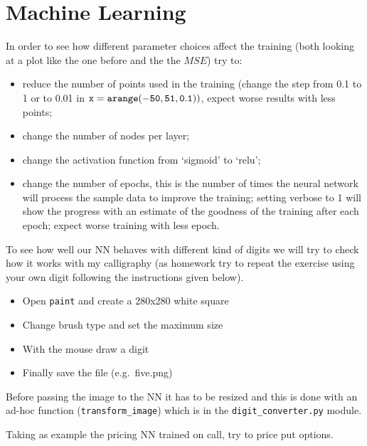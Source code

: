 \chapter{Machine Learning}\label{introduction-to-python---lesson-15}

\begin{Exercise}
In order to see how different parameter choices affect the training
(both looking at a plot like the one before and the the \(MSE\)) try to:

\begin{itemize}
\tightlist
\item
  reduce the number of points used in the training (change the step from
  0.1 to 1 or to 0.01 in \(\tt{x = arange(-50, 51, 0.1))}\), expect
  worse results with less points;
\item
  change the number of nodes per layer;
\item
  change the activation function from `sigmoid' to `relu';
\item
  change the number of epochs, this is the number of times the neural
  network will process the sample data to improve the training; setting
  verbose to 1 will show the progress with an estimate of the goodness
  of the training after each epoch; expect worse training with less
  epoch.
\end{itemize}
\end{Exercise}
\begin{Answer}
\end{Answer}

\begin{Exercise}
To see how well our NN behaves with different kind of digits we will try
to check how it works with my calligraphy (as homework try to repeat the
exercise using your own digit following the instructions given below).

\begin{itemize}
\tightlist
\item
  Open \texttt{paint} and create a 280x280 white square
\item
  Change brush type and set the maximum size
\item
  With the mouse draw a digit
\item
  Finally save the file (e.g.~five.png)
\end{itemize}

Before passing the image to the NN it has to be resized and this is done
with an ad-hoc function (\texttt{transform\_image}) which is in the
\texttt{digit\_converter.py} module.
\end{Exercise}
\begin{Answer}
\end{Answer}

\begin{Exercise}
Taking as example the pricing NN trained on call, try to price put
options.
\end{Exercise}
\begin{Answer}
\end{Answer}
